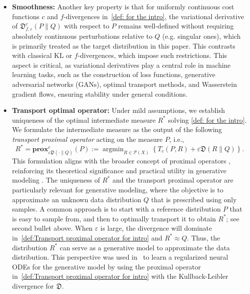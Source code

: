 \documentclass{amsart}
\newcommand{\MK}[1]{\textcolor{orange}{MK: #1}}
\newcommand{\rb}[1]{#1} %
\theoremstyle{definition}
\theoremstyle{remark}
\numberwithin{equation}{section}
\DeclareMathOperator*{\argmin}{argmin}
\begin{document}
\begin{itemize}
\medskip
\item{\bf Smoothness:} Another key property is that for uniformly continuous cost functions $c$ and $f$-divergences in~\eqref{def: for the intro},  the variational derivative of $\mathfrak{D}^c_{f,\varepsilon}(P\|Q)$ with respect to $P$ remains well-defined without requiring absolutely continuous perturbations relative to  $Q$ (e.g. singular ones), which is primarily treated as the target distribution in this paper. This contrasts with classical KL or  $f$-divergences, which impose such restrictions. This aspect is critical, as variational derivatives play a central role in machine learning tasks, such as the construction of loss functions, generative adversarial networks (GANs), optimal transport methods, and Wasserstein gradient flows, ensuring stability under general conditions. 
\medskip
\item {\bf Transport optimal operator:} Under mild assumptions, we establish uniqueness of the optimal intermediate measure $R^*$ solving \eqref{def: for the intro}. \rb{We formulate the intermediate measure as the output of the following \emph{transport proximal operator} acting on the measure $P$}, i.e.,
\begin{equation}\label{def:Transport proximal operator for intro}
    R^* = \textbf{prox}^c_{\varepsilon \mathfrak{D}(\cdot\|Q)}(P) :=  \argmin_{R\in \mathcal{P}(X)}\left\{T_c(P,R) + \varepsilon \mathfrak{D}(R\|Q)  \right\}.
\end{equation}
This formulation aligns with the broader concept of proximal operators \cite{parikh2014proximal}, reinforcing its theoretical significance and practical utility in generative modeling \cite{zhang2024wasserstein}. The uniqueness of $R^*$ and the transport proximal operator are particularly relevant for generative modeling, where the objective is to approximate an unknown data distribution
$Q$ that is prescribed using only samples. A common approach is to start with a reference distribution $P$ that is easy to sample from, and then to optimally transport it to obtain $R^*$; see second bullet above. \rb{When $\varepsilon$ is large, the divergence will dominate in~\eqref{def:Transport proximal operator for intro} and \(R^*\approx Q\). Thus, the distribution $R^*$ can serve as a generative model to approximate the data distribution. 
This perspective was used in~\cite{onken2021ot,finlay2020train, gu2024combining} to learn a regularized neural ODEs for the generative model by using the proximal operator in~\eqref{def:Transport proximal operator for intro} with the Kullback-Leibler divergence for $\mathfrak{D}$.}

\end{itemize}
\end{document}
